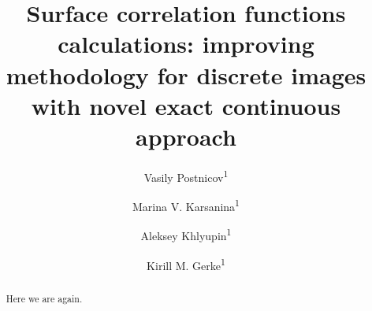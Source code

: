 \documentclass[reprint,amsmath,amssymb,aps,pre,showkeys,showpacs]{revtex4-1}
\begin{document}

\author{Vasily Postnicov\textsuperscript{1}}
\author{Marina V. Karsanina\textsuperscript{1}}
\author{Aleksey Khlyupin\textsuperscript{1}}
\author{Kirill M. Gerke\textsuperscript{1}}


\title{Surface correlation functions calculations: improving methodology for
  discrete images with novel exact continuous approach}

\begin{abstract}
  Here we are again.
\end{abstract}

\maketitle
\end{document}
